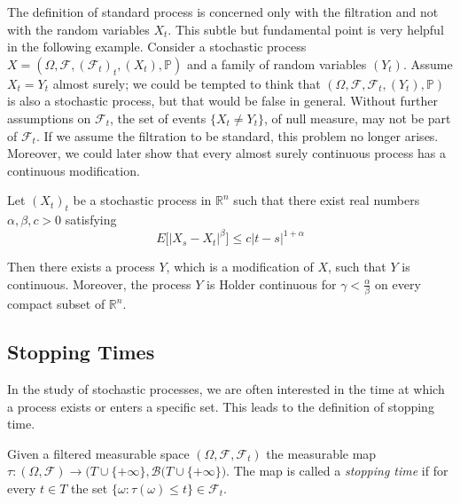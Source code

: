 The definition of standard process is concerned only with the filtration and not with the random variables $X_t$. This subtle but fundamental point is very helpful in the following example. Consider a stochastic process $X = (\Omega, \mathcal{F}, (\mathcal{F}_t)_t, (X_t), \mathbb{P})$ and a family of random variables $(Y_t)$. Assume $X_t = Y_t$ almost surely; we could be tempted to think that $(\Omega, \mathcal{F}, \mathcal{F}_t,(Y_t), \mathbb{P})$ is also a stochastic process, but that would be false in general. Without further assumptions on $\mathcal{F}_t$, the set of events $\{ X_t \neq Y_t \}$, of null measure, may not be part of $\mathcal{F}_t$. If we assume the filtration to be standard, this problem no longer arises. Moreover, we could later show that every almost surely continuous process has a continuous modification.

\begin{theorem}
    Let $(X_t)_t$ be a stochastic process in $\mathbb{R}^n$ such that there exist real numbers $\alpha, \beta, c > 0$ satisfying
    \begin{equation}
        E\Big[ \Big\vert X_s - X_t \Big\vert^{\beta} \Big] \leq c \big\vert t-s\big\vert^{1+\alpha}
    \end{equation}

    Then there exists a process $Y$, which is a modification of $X$, such that $Y$ is continuous. Moreover, the process $Y$ is Holder continuous for $\gamma < \frac{\alpha}{\beta}$ on every compact subset of $\mathbb{R}^n$. 
\end{theorem}

\subsection{Stopping Times}
In the study of stochastic processes, we are often interested in the time at which a process exists or enters a specific set. This leads to the definition of stopping time. 

\begin{definition}
    Given a filtered measurable space $(\Omega, \mathcal{F}, \mathcal{F}_t)$ the measurable map $\tau : (\Omega, \mathcal{F}) \to \Big(T \cup \{+\infty\}, \mathcal{B}(T \cup \{+\infty\} \Big)$. The map is called a \textit{stopping time} if for every $t \in T$ the set $\big\{  \omega : \tau(\omega) \leq t \big\} \in \mathcal{F}_t$. 
\end{definition}

